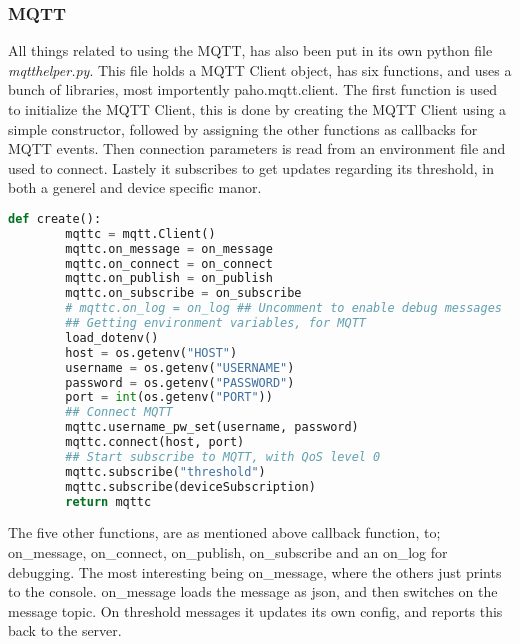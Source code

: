 \subsubsection*{MQTT}
All things related to using the MQTT, has also been put in its own python file \textit{mqtthelper.py}. This file holds a MQTT Client object, has six functions, and uses a bunch of libraries, most importently paho.mqtt.client. The first function is used to initialize the MQTT Client, this is done by creating the MQTT Client using a simple constructor, followed by assigning the other functions as callbacks for MQTT events. Then connection parameters is read from an environment file and used to connect. Lastely it subscribes to get updates regarding its threshold, in both a generel and device specific manor.
\begin{lstlisting}[language=Python, caption=Python MQTT setup, label={lst:rpmqtt}, basicstyle=\scriptsize]
    def create():
        mqttc = mqtt.Client()
        mqttc.on_message = on_message
        mqttc.on_connect = on_connect
        mqttc.on_publish = on_publish
        mqttc.on_subscribe = on_subscribe
        # mqttc.on_log = on_log ## Uncomment to enable debug messages
        ## Getting environment variables, for MQTT
        load_dotenv()
        host = os.getenv("HOST")
        username = os.getenv("USERNAME")
        password = os.getenv("PASSWORD")
        port = int(os.getenv("PORT"))
        ## Connect MQTT
        mqttc.username_pw_set(username, password)
        mqttc.connect(host, port)
        ## Start subscribe to MQTT, with QoS level 0
        mqttc.subscribe("threshold")
        mqttc.subscribe(deviceSubscription)
        return mqttc
\end{lstlisting}
The five other functions, are as mentioned above callback function, to; on\_message, on\_connect, on\_publish, on\_subscribe and an on\_log for debugging. The most interesting being on\_message, where the others just prints to the console. on\_message loads the message as json, and then switches on the message topic. On threshold messages it updates its own config, and reports this back to the server.
